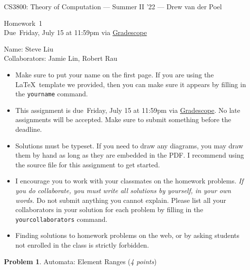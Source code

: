 \documentclass[11pt]{article}
\newcommand{\yourname}{}
\newcommand{\yourcollaborators}{}
\theoremstyle{definition}
\newcommand{\instructor}{Drew van der Poel}
\newcommand{\hwnum}{1}
\newcommand{\hwdue}{Friday, July 15 at 11:59pm via \href{https://www.gradescope.com/courses/406943}{Gradescope}}
\theoremstyle{theorem}
\newtheorem{prob}{Problem}
\begin{document}
{\Large 
\begin{center}{CS3800: Theory of Computation} --- Summer II '22 --- \instructor \end{center}}
{\large
\vspace{10pt}
\noindent Homework~\hwnum \vspace{2pt}\\
Due~\hwdue}

\bigskip
{\large
\noindent Name: Steve Liu\yourname \vspace{2pt}\\ Collaborators: Jamie Lin, Robert Rau \yourcollaborators}

\vspace{15pt}
\begin{itemize}

\item Make sure to put your name on the first page.  If you are using the \LaTeX~template we provided, then you can make sure it appears by filling in the \texttt{yourname} command.

\item This assignment is due~\hwdue.  No late assignments will be accepted.  Make sure to submit something before the deadline.

\item Solutions must be typeset.  If you need to draw any diagrams, you may draw them by hand as long as they are embedded in the PDF.  I recommend using the source file for this assignment to get started.

\item I encourage you to work with your classmates on the homework problems. \emph{If you do collaborate, you must write all solutions by yourself, in your own words.}  Do not submit anything you cannot explain.  Please list all your collaborators in your solution for each problem by filling in the \texttt{yourcollaborators} command.

\item Finding solutions to homework problems on the web, or by asking students not enrolled in the class is strictly forbidden.

\end{itemize}



\newpage

\begin{prob} Automata: Element Ranges (\emph{4 points})\end{prob}
\end{document}
